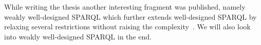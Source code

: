 While writing the thesis another interesting fragment was published, namely
weakly well-designed SPARQL which further extends well-designed SPARQL by
relaxing several restrictions without raising the
complexity~\cite{kaminski_bwd}. We will also look into 
weakly well-designed SPARQL in the end. 

%

